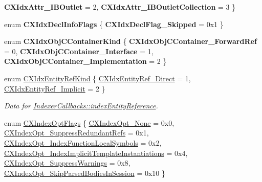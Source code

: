 \begin{DoxyCompactItemize}
{\bfseries C\+X\+Idx\+Attr\+\_\+\+I\+B\+Outlet} = 2, 
{\bfseries C\+X\+Idx\+Attr\+\_\+\+I\+B\+Outlet\+Collection} = 3
 \}
\item 
\mbox{\label{group__CINDEX__HIGH_gac2ab581a399019383ada51a95ad4661c}} 
enum {\bfseries C\+X\+Idx\+Decl\+Info\+Flags} \{ {\bfseries C\+X\+Idx\+Decl\+Flag\+\_\+\+Skipped} = 0x1
 \}
\item 
\mbox{\label{group__CINDEX__HIGH_ga3a7b134403ae721de4bb61dbaa35ece0}} 
enum {\bfseries C\+X\+Idx\+Obj\+C\+Container\+Kind} \{ {\bfseries C\+X\+Idx\+Obj\+C\+Container\+\_\+\+Forward\+Ref} = 0, 
{\bfseries C\+X\+Idx\+Obj\+C\+Container\+\_\+\+Interface} = 1, 
{\bfseries C\+X\+Idx\+Obj\+C\+Container\+\_\+\+Implementation} = 2
 \}
\item 
enum \hyperlink{group__CINDEX__HIGH_ga4158d96205b540d3ef4992cf6689c2aa}{C\+X\+Idx\+Entity\+Ref\+Kind} \{ \hyperlink{group__CINDEX__HIGH_gga4158d96205b540d3ef4992cf6689c2aaa480bab642d15b16ba1156566979b8a4c}{C\+X\+Idx\+Entity\+Ref\+\_\+\+Direct} = 1, 
\hyperlink{group__CINDEX__HIGH_gga4158d96205b540d3ef4992cf6689c2aaa275d2671931e7a53f86372da524b5d61}{C\+X\+Idx\+Entity\+Ref\+\_\+\+Implicit} = 2
 \}\begin{DoxyCompactList}\small\item\em Data for \hyperlink{structIndexerCallbacks_a6d93809e7743a590beafa0387ac145dc}{Indexer\+Callbacks\+::index\+Entity\+Reference}. \end{DoxyCompactList}
\item 
enum \hyperlink{group__CINDEX__HIGH_ga8c30458ffd9b99a7fcd95a5759c99816}{C\+X\+Index\+Opt\+Flags} \{ \newline
\hyperlink{group__CINDEX__HIGH_gga8c30458ffd9b99a7fcd95a5759c99816a1f75207a1b25c860d647ffdfab0fa4c9}{C\+X\+Index\+Opt\+\_\+\+None} = 0x0, 
\hyperlink{group__CINDEX__HIGH_gga8c30458ffd9b99a7fcd95a5759c99816a3d5d796739d08fa05d257421d822a87c}{C\+X\+Index\+Opt\+\_\+\+Suppress\+Redundant\+Refs} = 0x1, 
\hyperlink{group__CINDEX__HIGH_gga8c30458ffd9b99a7fcd95a5759c99816adb72ccbaf307a330f661e8d9918a5c9c}{C\+X\+Index\+Opt\+\_\+\+Index\+Function\+Local\+Symbols} = 0x2, 
\hyperlink{group__CINDEX__HIGH_gga8c30458ffd9b99a7fcd95a5759c99816ad1a2aba8a113667f69dfc84a852b026e}{C\+X\+Index\+Opt\+\_\+\+Index\+Implicit\+Template\+Instantiations} = 0x4, 
\newline
\hyperlink{group__CINDEX__HIGH_gga8c30458ffd9b99a7fcd95a5759c99816a827daacd70e8610538f7fa0fee0897ff}{C\+X\+Index\+Opt\+\_\+\+Suppress\+Warnings} = 0x8, 
\hyperlink{group__CINDEX__HIGH_gga8c30458ffd9b99a7fcd95a5759c99816a2c92f2b0443ba766fc00a9d6bb2f25aa}{C\+X\+Index\+Opt\+\_\+\+Skip\+Parsed\+Bodies\+In\+Session} = 0x10
 \}
\end{DoxyCompactItemize}
